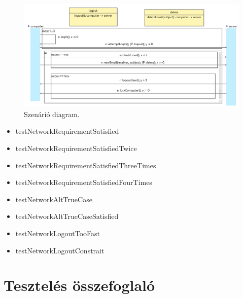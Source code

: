 \begin{figure}[!ht]
    \centering
    \includegraphics[width=150mm, keepaspectratio]{figures/diagramOperatorExample.png}
    \caption{Szenárió diagram.}
\end{figure}

\begin{itemize}
    \item testNetworkRequirementSatisfied
    \item testNetworkRequirementSatisfiedTwice
    \item testNetworkRequirementSatisfiedThreeTimes
    \item testNetworkRequirementSatisfiedFourTimes
    \item testNetworkAltTrueCase
    \item testNetworkAltTrueCaseSatisfied
    \item testNetworkLogoutTooFast
    \item testNetworkLogoutConstrait
\end{itemize}

\clearpage\section{Tesztelés összefoglaló}

